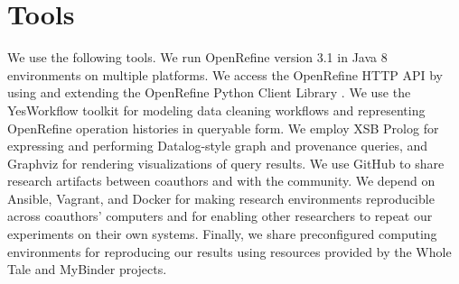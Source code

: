 \section{Tools}

We use the following tools. We run OpenRefine version 3.1 \cite{OpenRefine} in Java 8 environments on multiple platforms. We access the OpenRefine HTTP API by using and extending the OpenRefine Python Client Library \cite{makepeace18ORclient}. We use the YesWorkflow toolkit \cite{yw-website} for modeling data cleaning workflows and representing OpenRefine operation histories in queryable form. We employ XSB Prolog \cite{xsb_software} for expressing and performing Datalog-style graph and provenance queries, and Graphviz for rendering visualizations of query results. We use GitHub to share research artifacts between coauthors and with the community. We depend on Ansible, Vagrant, and Docker for making research environments reproducible across coauthors' computers and for enabling other researchers to repeat our experiments on their own systems. Finally, we share preconfigured computing environments for reproducing our results using resources provided by the Whole Tale and MyBinder projects.

